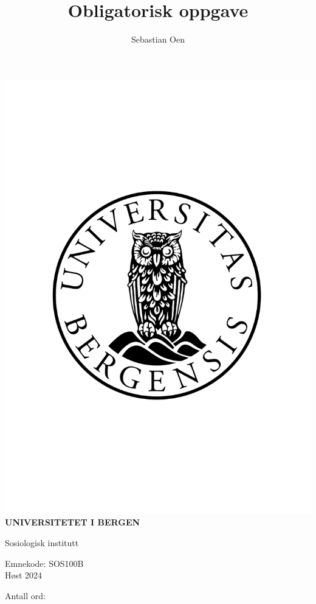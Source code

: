 \title{Obligatorisk oppgave}
\author{Sebastian Oen}

\begin{titlepage}
	\begin{center}
		\includegraphics[width=0.48\columnwidth]{figures/UIBmerkegrayscaleV8}
		\Huge \textbf{UNIVERSITETET I BERGEN}
		
		Sosiologisk institutt
		
		\large Emnekode: SOS100B \\ Høst 2024
		
		\Huge \textbf{\@title}
		
		\large \@author
		
		Antall ord: 
	\end{center}
\end{titlepage}